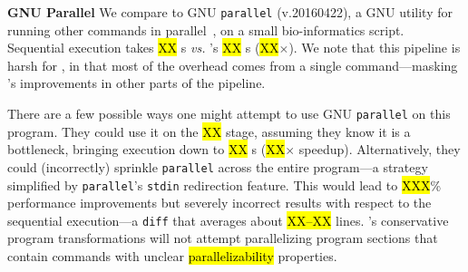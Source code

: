 \documentclass[letterpaper,twocolumn,10pt]{article}
\newcommand{\vs}{{\em vs.} }
\newcommand{\heading}[1]{\vspace{4pt}\noindent\textbf{#1}\enspace}
\newcommand{\ttt}[1]{\texttt{#1}}
\newcommand{\todo}[1]{\hl{#1}\xspace}
\begin{document}
\heading{GNU Parallel}
We compare \sys to GNU \ttt{parallel} (v.20160422), a GNU utility for running other commands in parallel~\cite{Tange2011a}, on a small bio-informatics script.
Sequential execution takes \todo{XX}s \vs \sys's \todo{XX}s (\todo{XX}$\times$).
We note that this pipeline is harsh for \sys, in that most of the overhead comes from a single command---masking \sys's improvements in other parts of the pipeline.


There are a few possible ways one might attempt to use GNU \ttt{parallel} on this program.
They could use it on the \todo{XX} stage, assuming they know it is a bottleneck, bringing execution down to \todo{XX}s (\todo{XX}$\times$ speedup).
Alternatively, they could (incorrectly) sprinkle \ttt{parallel} across the entire program---a strategy simplified by \ttt{parallel}'s \ttt{stdin} redirection feature.
This would lead to \todo{XXX}\% performance improvements but severely incorrect results with respect to the sequential execution---a \ttt{diff} that averages about \todo{XX--XX} lines.
\sys's conservative program transformations will not attempt parallelizing program sections that contain commands with unclear \todo{parallelizability} properties.


\end{document}
